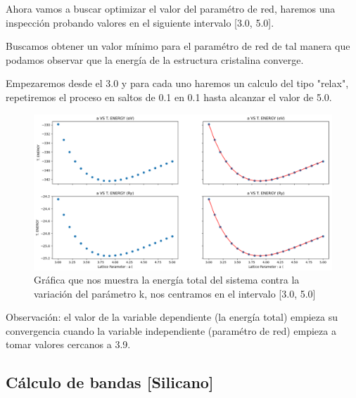 \vspace{0.5cm}

Ahora vamos a buscar optimizar el valor del paramétro de red, haremos una inspección probando valores
en el siguiente intervalo [3.0, 5.0].
 
\vspace{0.5cm}

Buscamos obtener un valor mínimo para el paramétro de red de tal manera que podamos observar que la energía
de la estructura cristalina converge.

\vspace{0.5cm}

Empezaremos desde el 3.0 y para cada uno haremos un calculo del tipo "relax", repetiremos el proceso
en saltos de 0.1 en 0.1 hasta alcanzar el valor de 5.0.

\begin{figure}[H]
    \centering
    \includegraphics[scale=0.33]{images_silicano/Lattice_parameter_vs_Energy.png}
    \caption{Gráfica que nos muestra la energía total del sistema contra la variación del parámetro k, nos centramos en el intervalo [3.0, 5.0]}
\end{figure}

\vspace{0.5cm}

Observación: el valor de la variable dependiente (la energía total) empieza su convergencia cuando 
la variable independiente (paramétro de red) empieza a tomar valores cercanos a 3.9.



\newpage

\subsection{Cálculo de bandas [Silicano]}

